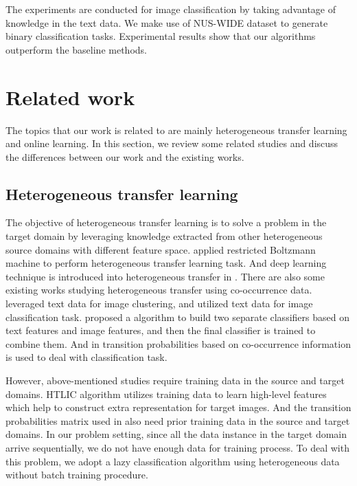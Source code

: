\documentclass{article} %
\theoremstyle{remark}
\theoremstyle{definition}
\begin{document}
The experiments are conducted for image classification by taking advantage of knowledge in the text data.
We make use of NUS-WIDE dataset to generate binary classification tasks.
Experimental results show that our algorithms outperform the baseline methods.

\section{Related work}

The topics that our work is related to are mainly heterogeneous transfer learning and online learning.
In this section, we review some related studies and discuss the differences between our work and the existing works.

\subsection{Heterogeneous transfer learning}
The objective of heterogeneous transfer learning is to solve a problem in the target domain by leveraging knowledge extracted from other heterogeneous source domains with different feature space.
\citeauthor{wei2011heterogeneous} applied restricted Boltzmann machine to perform heterogeneous transfer learning task.
And deep learning technique is introduced into heterogeneous transfer in \cite{zhou2014hybrid}.
There are also some existing works studying heterogeneous transfer using co-occurrence data.
\citeauthor{yang2009heterogeneous} leveraged text data for image clustering, and \citeauthor{zhu2011heterogeneous} utilized text data for image classification task.
\citeauthor{wang2009building} proposed a algorithm to build two separate classifiers based on text features and image features, and then the final classifier is trained to combine them.
And in \cite{ng2012co,wu2014co,tan2014mixed} transition probabilities based on co-occurrence information is used to deal with classification task.

However, above-mentioned studies require training data in the source and target domains.
HTLIC algorithm \cite{zhu2011heterogeneous} utilizes training data to learn high-level features which help to construct extra representation for target images.
And the transition probabilities matrix used in \cite{ng2012co,wu2014co} also need prior training data in the source and target domains.
In our problem setting, since all the data instance in the target domain arrive sequentially, we do not have enough data for training process.
To deal with this problem, we adopt a lazy classification algorithm using heterogeneous data without batch training procedure.
\end{document}
